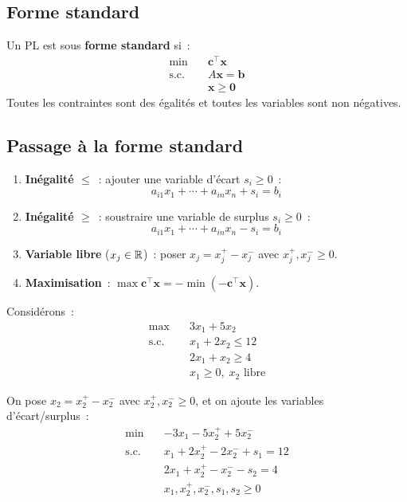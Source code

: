 \subsection{Forme standard}

\begin{definition}
Un PL est sous \textbf{forme standard} si~:
\[
\begin{aligned}
  \min \quad & \mathbf{c}^\top \mathbf{x} \\
  \text{s.c.} \quad
    & A\mathbf{x} = \mathbf{b} \\
    & \mathbf{x} \ge \mathbf{0}
\end{aligned}
\]
Toutes les contraintes sont des \'egalit\'es et toutes les variables sont
non n\'egatives.
\end{definition}

\subsection{Passage \`a la forme standard}

\begin{formules}[title=\textbf{R\`egles de conversion}]
\begin{enumerate}
  \item \textbf{In\'egalit\'e $\le$}~: ajouter une variable d'\'ecart
        $s_i \ge 0$~:
        \[a_{i1}x_1 + \cdots + a_{in}x_n + s_i = b_i\]
  \item \textbf{In\'egalit\'e $\ge$}~: soustraire une variable de surplus
        $s_i \ge 0$~:
        \[a_{i1}x_1 + \cdots + a_{in}x_n - s_i = b_i\]
  \item \textbf{Variable libre} ($x_j \in \mathbb{R}$)~: poser
        $x_j = x_j^+ - x_j^-$ avec $x_j^+, x_j^- \ge 0$.
  \item \textbf{Maximisation}~: $\max \mathbf{c}^\top\mathbf{x} =
        -\min(-\mathbf{c}^\top\mathbf{x})$.
\end{enumerate}
\end{formules}

\begin{exemple}
Consid\'erons~:
\[
\begin{aligned}
  \max \quad & 3x_1 + 5x_2 \\
  \text{s.c.} \quad
    & x_1 + 2x_2 \le 12 \\
    & 2x_1 + x_2 \ge 4 \\
    & x_1 \ge 0, \; x_2 \text{ libre}
\end{aligned}
\]

On pose $x_2 = x_2^+ - x_2^-$ avec $x_2^+, x_2^- \ge 0$, et on ajoute
les variables d'\'ecart/surplus~:
\[
\begin{aligned}
  \min \quad & -3x_1 - 5x_2^+ + 5x_2^- \\
  \text{s.c.} \quad
    & x_1 + 2x_2^+ - 2x_2^- + s_1 = 12 \\
    & 2x_1 + x_2^+ - x_2^- - s_2 = 4 \\
    & x_1, x_2^+, x_2^-, s_1, s_2 \ge 0
\end{aligned}
\]
\end{exemple}

